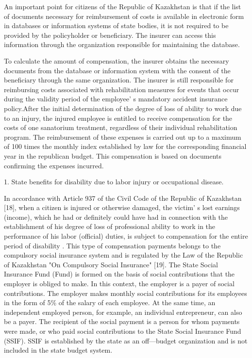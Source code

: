 \begin{multicols}{2}

An important point for citizens of the Republic of Kazakhstan is that if
the list of documents necessary for reimbursement of costs is available
in electronic form in databases or information systems of state bodies,
it is not required to be provided by the policyholder or beneficiary.
The insurer can access this information through the organization
responsible for maintaining the database.

To calculate the amount of compensation, the insurer obtains the
necessary documents from the database or information system with the
consent of the beneficiary through the same organization. The insurer is
still responsible for reimbursing costs associated with rehabilitation
measures for events that occur during the validity period of the
employee' s mandatory accident insurance policy.After the
initial determination of the degree of loss of ability to work due to an
injury, the injured employee is entitled to receive compensation for the
costs of one sanatorium treatment, regardless of their individual
rehabilitation program. The reimbursement of these expenses is carried
out up to a maximum of 100 times the monthly index established by law
for the corresponding financial year in the republican budget. This
compensation is based on documents confirming the expenses incurred.

1. State benefits for disability due to labor injury or occupational
disease.

In accordance with Article 937 of the Civil Code of the Republic of
Kazakhstan {[}18{]}, when a citizen is injured or otherwise damaged, the
victim' s lost earnings (income), which he had or
definitely could have had in connection with the establishment of his
degree of loss of professional ability to work in the performance of his
labor (official) duties, is subject to compensation for the entire
period of disability . This type of compensation payments belongs to the
compulsory social insurance system and is regulated by the Law of the
Republic of Kazakhstan "On Compulsory Social Insurance" {[}19{]}. The
State Social Insurance Fund (Fund) is formed on the basis of social
contributions that the employer is obliged to make. In this context, the
employer is a payer of social contributions. The employer makes monthly
social contributions for its employees in the form of 5\% of the salary
of each employee. At the same time, an independent employed person, for
example, an individual entrepreneur, can also be a payer. The recipient
of the social payment is a person for whom payments were made, or who
paid social contributions to the State Social Insurance Fund (SSIF).
SSIF is established by the state as an off---budget organization and is
not included in the state budget system.


\end{multicols}
